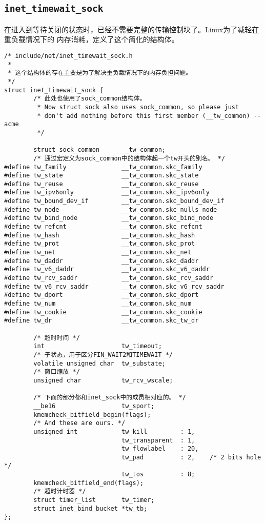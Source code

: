     \subsection{\texttt{inet_timewait_sock}}
        \label{subsec:inet_timewait_sock}
            在进入到等待关闭的状态时，已经不需要完整的传输控制块了。Linux为了减轻在重负载情况下的
            内存消耗，定义了这个简化的结构体。
\begin{verbatim}
/* include/net/inet_timewait_sock.h
 *
 * 这个结构体的存在主要是为了解决重负载情况下的内存负担问题。
 */
struct inet_timewait_sock {
        /* 此处也使用了sock_common结构体。
         * Now struct sock also uses sock_common, so please just
         * don't add nothing before this first member (__tw_common) --acme
         */

        struct sock_common      __tw_common;
        /* 通过宏定义为sock_common中的结构体起一个tw开头的别名。 */
#define tw_family               __tw_common.skc_family
#define tw_state                __tw_common.skc_state
#define tw_reuse                __tw_common.skc_reuse
#define tw_ipv6only             __tw_common.skc_ipv6only
#define tw_bound_dev_if         __tw_common.skc_bound_dev_if
#define tw_node                 __tw_common.skc_nulls_node
#define tw_bind_node            __tw_common.skc_bind_node
#define tw_refcnt               __tw_common.skc_refcnt
#define tw_hash                 __tw_common.skc_hash
#define tw_prot                 __tw_common.skc_prot
#define tw_net                  __tw_common.skc_net
#define tw_daddr                __tw_common.skc_daddr
#define tw_v6_daddr             __tw_common.skc_v6_daddr
#define tw_rcv_saddr            __tw_common.skc_rcv_saddr
#define tw_v6_rcv_saddr         __tw_common.skc_v6_rcv_saddr
#define tw_dport                __tw_common.skc_dport
#define tw_num                  __tw_common.skc_num
#define tw_cookie               __tw_common.skc_cookie
#define tw_dr                   __tw_common.skc_tw_dr

        /* 超时时间 */
        int                     tw_timeout; 
        /* 子状态，用于区分FIN_WAIT2和TIMEWAIT */
        volatile unsigned char  tw_substate; 
        /* 窗口缩放 */
        unsigned char           tw_rcv_wscale;

        /* 下面的部分都和inet_sock中的成员相对应的。 */
        __be16                  tw_sport;
        kmemcheck_bitfield_begin(flags);
        /* And these are ours. */
        unsigned int            tw_kill         : 1,
                                tw_transparent  : 1,
                                tw_flowlabel    : 20,   
                                tw_pad          : 2,    /* 2 bits hole */
                                tw_tos          : 8;
        kmemcheck_bitfield_end(flags);
        /* 超时计时器 */
        struct timer_list       tw_timer;
        struct inet_bind_bucket *tw_tb;
};
\end{verbatim}

